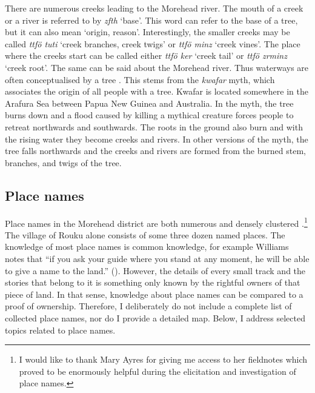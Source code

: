There are numerous creeks leading to the Morehead river. The mouth of a creek or a river is referred to by \emph{zfth} `base'. This word can refer to the base of a tree, but it can also mean `origin, reason'. Interestingly, the smaller creeks may be called \emph{ttfö tuti} `creek branches, creek twigs' or \emph{ttfö minz} `creek vines'. The place where the creeks start can be called either \emph{ttfö ker} `creek tail' or \emph{ttfö zrminz} `creek root'. The same can be said about the Morehead river. Thus waterways are often conceptualised by a tree . This stems from the \emph{kwafar} myth, which associates the origin of all people with a tree. Kwafar is located somewhere in the Arafura Sea between Papua New Guinea and Australia. In the myth, the tree burns down and a flood caused by killing a mythical creature forces people to retreat northwards and southwards. The roots in the ground also burn and with the rising water they become creeks and rivers. In other versions of the myth, the tree falls northwards and the creeks and rivers are formed from the burned stem, branches, and twigs of the tree.

\subsection{Place names}\label{placenames}

Place names in the Morehead district are both numerous and densely clustered \citep[129]{Ayres:ws}.\footnote{I would like to thank Mary Ayres for giving me access to her fieldnotes which proved to be enormously helpful during the elicitation and investigation of place names.} The village of Rouku alone consists of some three dozen named places. The knowledge of most place names is common knowledge, for example Williams notes that ``if you ask your guide where you stand at any moment, he will be able to give a name to the land.'' (\citeyear[207]{Williams:1936transfly}). However, the details of every small track and the stories that belong to it is something only known by the rightful owners of that piece of land. In that sense, knowledge about place names can be compared to a proof of ownership. Therefore, I deliberately do not include a complete list of collected place names, nor do I provide a detailed map. Below, I address selected topics related to place names.

